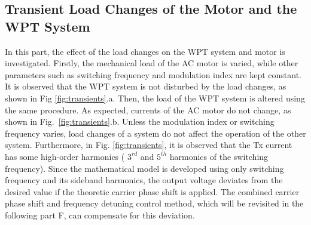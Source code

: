 \documentclass[journal]{IEEEtran}
\begin{document}
\subsection{Transient Load Changes of the Motor and the WPT System }
In this part, the effect of the load changes on the WPT system and motor is investigated.
Firstly,  the mechanical load of the AC motor is varied, while other parameters such as switching frequency and modulation index are kept constant. It is observed that the WPT system is not disturbed by the load changes, as shown in Fig \ref{fig:transients}.a. 
Then, the load of the WPT system is altered using the same procedure.
As expected, currents of the AC motor do not change, as shown in Fig.~\ref{fig:transients}.b.  
Unless the modulation index or switching frequency varies, load changes of a system do not affect the operation of the other system.
Furthermore, in Fig.  \ref{fig:transients}, it is observed that the Tx current has some high-order harmonics ( $3^{rd}$ and $5^{th}$ harmonics of the switching frequency). Since the mathematical model is developed using only switching frequency and its sideband harmonics, the output voltage deviates from the desired value if the theoretic carrier phase shift is applied.
The combined carrier phase shift and frequency detuning control method, which will be revisited in the following part F,  can compensate for this deviation.
\vspace{-4mm}
\end{document}
